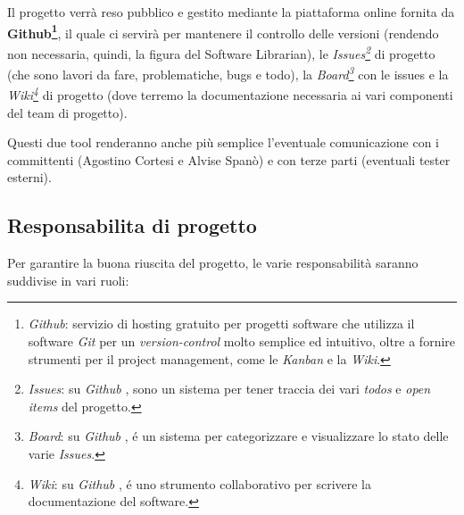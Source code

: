 \documentclass{article}
\begin{document}
  Il progetto verrà reso pubblico e gestito mediante la piattaforma online
  fornita da \textbf{Github\footnote{\emph{Github}: servizio di hosting
    gratuito per progetti software che utilizza il software \emph{Git} per
    un \emph{version-control} molto semplice ed intuitivo, oltre a fornire
    strumenti per il project management, come le \emph{Kanban} e la
    \emph{Wiki}.}}, il quale ci servirà per mantenere il
  controllo delle versioni (rendendo non necessaria, quindi, la figura del
  Software Librarian), le \emph{Issues\footnote{\emph{Issues}: su
    \emph{Github} , sono un sistema per tener traccia dei vari
    \emph{todos} e \emph{open items} del progetto.}} di progetto (che sono
  lavori da fare, problematiche, bugs e todo), la \emph{Board\footnote{\emph{Board}:
    su \emph{Github} , é un sistema per categorizzare e
    visualizzare lo stato delle varie \emph{Issues}.}} con le
  issues e la \emph{Wiki\footnote{\emph{Wiki}: su \emph{Github}
    , é uno strumento collaborativo per scrivere la documentazione del
    software.}} di progetto (dove terremo la documentazione necessaria ai
  vari componenti del team di progetto).
  
  Questi due tool renderanno anche più semplice l'eventuale comunicazione
  con i committenti (Agostino Cortesi e Alvise Spanò) e con terze parti
  (eventuali tester esterni).
  
  \subsection{Responsabilita di
  progetto}
  
  Per garantire la buona riuscita del progetto, le varie responsabilità
  saranno suddivise in vari ruoli:
  
\end{document}
